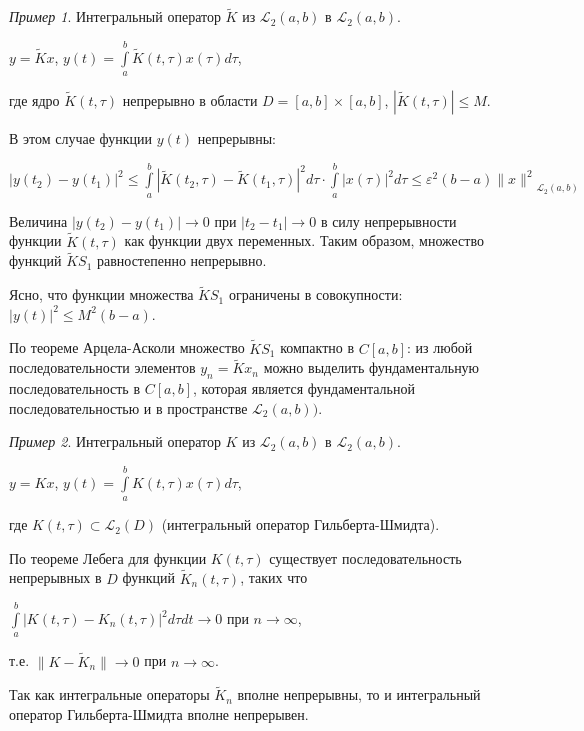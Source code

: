 \documentclass[12pt,a4paper,titlepage,oneside]{book}
\theoremstyle{definition}
\theoremstyle{plain}
\theoremstyle{remark}
\theoremstyle{remark}
\newtheorem*{example}{Пример}
\theoremstyle{remark}
\theoremstyle{remark}
\theoremstyle{plain}
\theoremstyle{plain}
\begin{document}
\begin{example}Интегральный оператор $\widetilde{K}$ из $\mathcal{L}_2(a,b)$ в $\mathcal{L}_2(a,b)$.

\begin{center}
$y=\widetilde{K}x$, $y(t)=\displaystyle\int\limits_a^b \widetilde{K}(t, \tau)x(\tau)d\tau$,
\end{center}

где ядро $\widetilde{K}(t, \tau)$ непрерывно в области $D=[a,b]\times[a,b]$, $|\widetilde{K}(t, \tau)|\leqslant M$.

В этом случае функции $y(t)$ непрерывны:

\begin{center}
$|y(t_2)-y(t_1)|^2\leq \displaystyle\int\limits_a^b |\widetilde{K}(t_2, \tau)-\widetilde{K}(t_1, \tau)|^2d\tau \cdot \displaystyle\int\limits_a^b |x(\tau)|^2 d\tau \leqslant \varepsilon^2 (b-a){\lVert x\rVert^2}_{\mathcal{L}_2(a,b)}$
\end{center}

Величина $|y(t_2)-y(t_1)|\to 0$ при $|t_2-t_1|\to 0$ в силу непрерывности функции $\widetilde{K}(t, \tau)$ как функции двух переменных. Таким образом, множество функций $\widetilde{K} S_1$ равностепенно непрерывно.

Ясно, что функции множества $\widetilde{K} S_1$ ограничены в совокупности: $|y(t)|^2 \leqslant M^2 (b-a)$.

По теореме Арцела-Асколи множество $\widetilde{K} S_1$ компактно в $C[a,b]$: из любой последовательности элементов $y_n=\widetilde{K} x_n$ можно выделить фундаментальную последовательность в $C[a,b]$, которая является фундаментальной последовательностью и в пространстве $\mathcal{L}_2 (a,b))$.
\end{example}
\begin{example}Интегральный оператор $K$ из $\mathcal{L}_2(a,b)$ в $\mathcal{L}_2(a,b)$.
\begin{center}
$y=Kx$, $y(t)=\int\limits_a^b K(t, \tau)x(\tau)d\tau $,
\end{center}
где $K(t, \tau)\subset \mathcal{L}_2(D)$ (интегральный оператор Гильберта-Шмидта).

По теореме Лебега для функции $K(t, \tau)$ существует последовательность непрерывных в $D$ функций $\widetilde{K}_n (t, \tau)$, таких что
\begin{center}
$\int\limits_a^b |K(t, \tau)-K_n(t, \tau)|^2d\tau dt \to 0$ при $n\to \infty$,
\end{center}
\begin{center}
т.е. $\lVert K-\widetilde{K}_n \rVert \to 0$ при $n\to \infty$.
\end{center}

Так как интегральные операторы $\widetilde{K}_n$ вполне непрерывны, то и интегральный оператор Гильберта-Шмидта вполне непрерывен.
\end{example}
\end{document}
